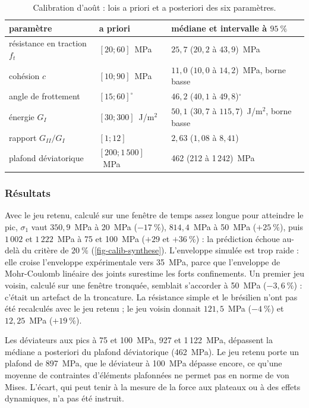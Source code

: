 \begin{table}[htbp]
\centering
\caption{Calibration d'août : lois a priori et a posteriori des six paramètres.}
\label{tab-calib-aout}
\small
\begin{tabular}{@{}lll@{}}
\toprule
paramètre & a priori & médiane et intervalle à $95~\%$ \\
\midrule
résistance en traction $f_t$ & $[20 ; 60]$~MPa & $25{,}7$ ($20{,}2$ à $43{,}9$)~MPa \\
cohésion $c$ & $[10 ; 90]$~MPa & $11{,}0$ ($10{,}0$ à $14{,}2$)~MPa, borne basse \\
angle de frottement & $[15 ; 60]^\circ$ & $46{,}2$ ($40{,}1$ à $49{,}8$)$^\circ$ \\
énergie $G_I$ & $[30 ; 300]$~J/m$^2$ & $50{,}1$ ($30{,}7$ à $115{,}7$)~J/m$^2$, borne basse \\
rapport $G_{II}/G_I$ & $[1 ; 12]$ & $2{,}63$ ($1{,}08$ à $8{,}41$) \\
plafond déviatorique & $[200 ; 1\,500]$~MPa & 462 (212 à 1\,242)~MPa \\
\bottomrule
\end{tabular}
\end{table}

\subsubsection{Résultats}

Avec le jeu retenu, calculé sur une fenêtre de temps assez longue pour atteindre le pic, $\sigma_1$ vaut $350{,}9$~MPa à 20~MPa ($-17~\%$), $814{,}4$~MPa à 50~MPa ($+25~\%$), puis $1\,002$ et $1\,222$~MPa à 75 et 100~MPa ($+29$ et $+36~\%$) : la prédiction échoue au-delà du critère de $20~\%$ (\cref{fig-calib-synthese}). L'enveloppe simulée est trop raide : elle croise l'enveloppe expérimentale vers 35~MPa, parce que l'enveloppe de Mohr-Coulomb linéaire des joints surestime les forts confinements. Un premier jeu voisin, calculé sur une fenêtre tronquée, semblait s'accorder à 50~MPa ($-3{,}6~\%$) : c'était un artefact de la troncature. La résistance simple et le brésilien n'ont pas été recalculés avec le jeu retenu ; le jeu voisin donnait $121{,}5$~MPa ($-4~\%$) et $12{,}25$~MPa ($+19~\%$).

Les déviateurs aux pics à 75 et 100~MPa, 927 et 1\,122~MPa, dépassent la médiane a posteriori du plafond déviatorique (462~MPa). Le jeu retenu porte un plafond de 897~MPa, que le déviateur à 100~MPa dépasse encore, ce qu'une moyenne de contraintes d'éléments plafonnées ne permet pas en norme de von Mises. L'écart, qui peut tenir à la mesure de la force aux plateaux ou à des effets dynamiques, n'a pas été instruit.


